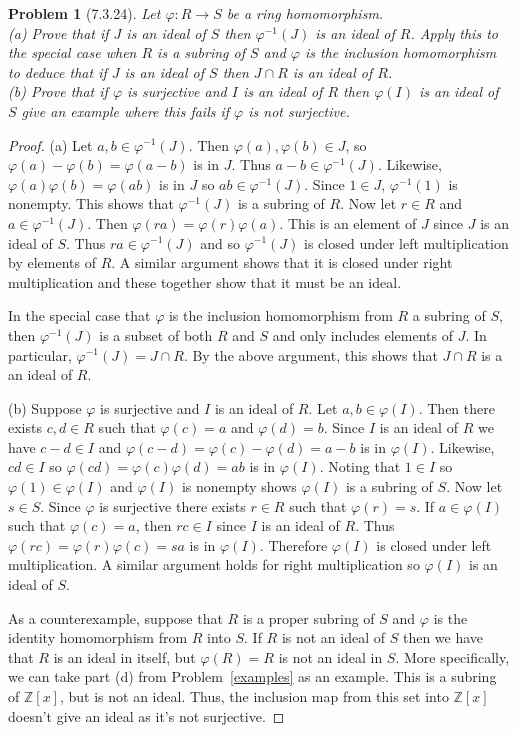 \documentclass{article}
\newtheorem{problem}{Problem}
\begin{document}
\begin{problem}[7.3.24]
Let $\varphi : R \to S$ be a ring homomorphism.\\
(a) Prove that if $J$ is an ideal of $S$ then $\varphi^{-1}(J)$ is an ideal of $R$. Apply this to the special case when $R$ is a subring of $S$ and $\varphi$ is the inclusion homomorphism to deduce that if $J$ is an ideal of $S$ then $J \cap R$ is an ideal of $R$.\\
(b) Prove that if $\varphi$ is surjective and $I$ is an ideal of $R$ then $\varphi(I)$ is an ideal of $S$ give an example where this fails if $\varphi$ is not surjective.
\end{problem}
\begin{proof}
(a) Let $a, b \in \varphi^{-1}(J)$. Then $\varphi(a), \varphi(b) \in J$, so $\varphi(a)-\varphi(b) = \varphi(a-b)$ is in $J$. Thus $a-b \in \varphi^{-1}(J)$. Likewise, $\varphi(a)\varphi(b) = \varphi(ab)$ is in $J$ so $ab \in \varphi^{-1}(J)$. Since $1 \in J$, $\varphi^{-1}(1)$ is nonempty. This shows that $\varphi^{-1}(J)$ is a subring of $R$. Now let $r \in R$ and $a \in \varphi^{-1}(J)$. Then $\varphi(ra) = \varphi(r)\varphi(a)$. This is an element of $J$ since $J$ is an ideal of $S$. Thus $ra \in \varphi^{-1}(J)$ and so $\varphi^{-1}(J)$ is closed under left multiplication by elements of $R$. A similar argument shows that it is closed under right multiplication and these together show that it must be an ideal.

In the special case that $\varphi$ is the inclusion homomorphism from $R$ a subring of $S$, then $\varphi^{-1}(J)$ is a subset of both $R$ and $S$ and only includes elements of $J$. In particular, $\varphi^{-1}(J) = J \cap R$. By the above argument, this shows that $J \cap R$ is a an ideal of $R$.

(b) Suppose $\varphi$ is surjective and $I$ is an ideal of $R$. Let $a,b \in \varphi(I)$. Then there exists $c,d \in R$ such that $\varphi(c) = a$ and $\varphi(d) = b$. Since $I$ is an ideal of $R$ we have $c-d \in I$ and $\varphi(c-d) = \varphi(c) - \varphi(d) = a - b$ is in $\varphi(I)$. Likewise, $cd \in I$ so $\varphi(cd) = \varphi(c)\varphi(d) = ab$ is in $\varphi(I)$. Noting that $1 \in I$ so $\varphi(1) \in \varphi(I)$ and $\varphi(I)$ is nonempty shows $\varphi(I)$ is a subring of $S$. Now let $s \in S$. Since $\varphi$ is surjective there exists $r \in R$ such that $\varphi(r) = s$. If $a \in \varphi(I)$ such that $\varphi(c) = a$, then $rc \in I$ since $I$ is an ideal of $R$. Thus $\varphi(rc) = \varphi(r)\varphi(c) = sa$ is in $\varphi(I)$. Therefore $\varphi(I)$ is closed under left multiplication. A similar argument holds for right multiplication so $\varphi(I)$ is an ideal of $S$.

As a counterexample, suppose that $R$ is a proper subring of $S$ and $\varphi$ is the identity homomorphism from $R$ into $S$. If $R$ is not an ideal of $S$ then we have that $R$ is an ideal in itself, but $\varphi(R) = R$ is not an ideal in $S$. More specifically, we can take part (d) from Problem~\ref{examples} as an example. This is a subring of $\mathbb{Z}[x]$, but is not an ideal. Thus, the inclusion map from this set into $\mathbb{Z}[x]$ doesn't give an ideal as it's not surjective.
\end{proof}
\end{document}
